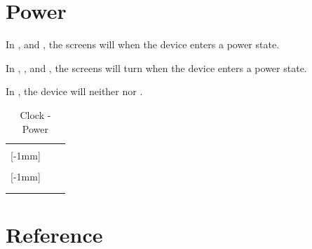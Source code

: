 \section{Power}

In ,  and , the screens will  when the device
enters a  power state.

\par\medskip

In , ,  and , the screens will turn 
when the device enters a  power state.

\par\medskip

In , the device will neither  nor .

\begin{table}[H]
  \begin{tabu}{ X[1,c,m] | X[1,c,m] | X[1,c,m] }
  \thrule
   &  &  \\ \mrule

  [-1mm]{} 
    &    &  \\ 
  &   &  \\ \mrule

  [-1mm]{} 
    &    \newline {}
    &  \\ 
  &  &  \\

  \bhrule
  \end{tabu}
\caption {Clock - Power}
\end{table}

\section{Reference} \label{Clock - Reference}

